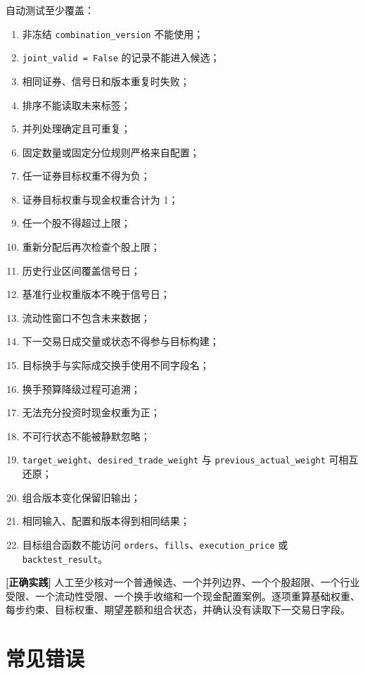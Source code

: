 自动测试至少覆盖：

\begin{enumerate}
  \item 非冻结 \texttt{combination\_version} 不能使用；
  \item \texttt{joint\_valid = False} 的记录不能进入候选；
  \item 相同证券、信号日和版本重复时失败；
  \item 排序不能读取未来标签；
  \item 并列处理确定且可重复；
  \item 固定数量或固定分位规则严格来自配置；
  \item 任一证券目标权重不得为负；
  \item 证券目标权重与现金权重合计为 1；
  \item 任一个股不得超过上限；
  \item 重新分配后再次检查个股上限；
  \item 历史行业区间覆盖信号日；
  \item 基准行业权重版本不晚于信号日；
  \item 流动性窗口不包含未来数据；
  \item 下一交易日成交量或状态不得参与目标构建；
  \item 目标换手与实际成交换手使用不同字段名；
  \item 换手预算降级过程可追溯；
  \item 无法充分投资时现金权重为正；
  \item 不可行状态不能被静默忽略；
  \item \texttt{target\_weight}、\texttt{desired\_trade\_weight} 与 \texttt{previous\_actual\_weight} 可相互还原；
  \item 组合版本变化保留旧输出；
  \item 相同输入、配置和版本得到相同结果；
  \item 目标组合函数不能访问 \texttt{orders}、\texttt{fills}、\texttt{execution\_price} 或 \texttt{backtest\_result}。
\end{enumerate}

\begin{practicebox}
\textbf{[正确实践]} 人工至少核对一个普通候选、一个并列边界、一个个股超限、一个行业受限、一个流动性受限、一个换手收缩和一个现金配置案例。逐项重算基础权重、每步约束、目标权重、期望差额和组合状态，并确认没有读取下一交易日字段。
\end{practicebox}

\section{常见错误}

